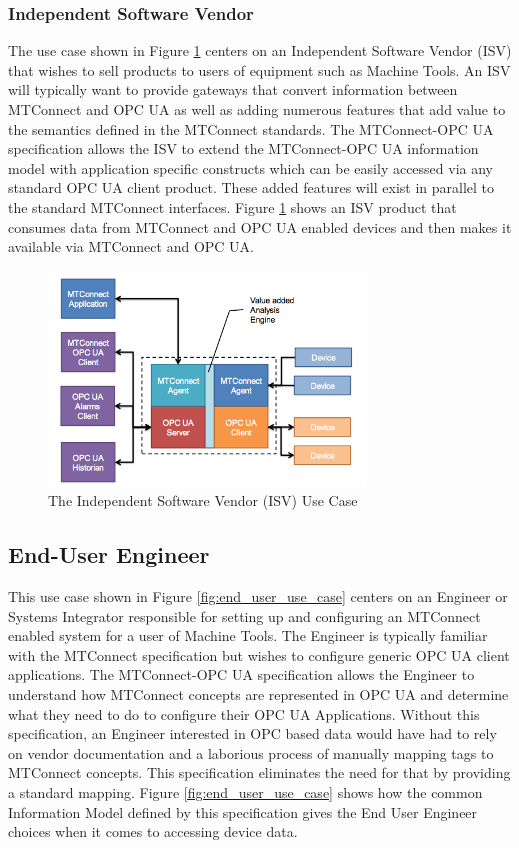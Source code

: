 \FloatBarrier

\subsubsection{Independent Software Vendor}

The use case shown in Figure \ref{fig:isv_use_case} centers on an Independent Software Vendor (ISV) that wishes to sell products to users of equipment such as Machine Tools. An ISV will typically want to provide gateways that convert information between MTConnect and OPC UA as well as adding numerous features that add value to the semantics defined in the MTConnect standards. The MTConnect-OPC UA specification allows the ISV to extend the MTConnect-OPC UA information model with application specific constructs which can be easily accessed via any standard OPC UA client product. These added features will exist in parallel to the standard MTConnect interfaces. Figure \ref{fig:isv_use_case} shows an ISV product that consumes data from MTConnect and OPC UA enabled devices and then makes it available via MTConnect and OPC UA.

\begin{figure}[h]
  \centering
  \includegraphics[width=0.75\textwidth]{diagrams/ISVUseCase.png}
  \caption{The Independent Software Vendor (ISV) Use Case}
  \label{fig:isv_use_case}
\end{figure}

\subsection{End-User Engineer}

This use case shown in Figure \ref{fig:end_user_use_case} centers on an Engineer or Systems Integrator responsible for setting up and configuring an MTConnect enabled system for a user of Machine Tools. The Engineer is typically familiar with the MTConnect specification but wishes to configure generic OPC UA client applications. The MTConnect-OPC UA specification allows the Engineer to understand how MTConnect concepts are represented in OPC UA and determine what they need to do to configure their OPC UA Applications. Without this specification, an Engineer interested in OPC based data would have had to rely on vendor documentation and a laborious process of manually mapping tags to MTConnect concepts. This specification eliminates the need for that by providing a standard mapping. Figure \ref{fig:end_user_use_case} shows how the common Information Model defined by this specification gives the End User Engineer choices when it comes to accessing device data.\

